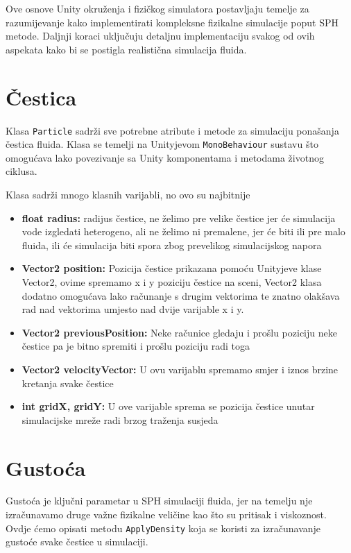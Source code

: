\documentclass[diplomskirad]{fer}
\begin{document}
    Ove osnove Unity okruženja i fizičkog simulatora postavljaju temelje za razumijevanje kako implementirati kompleksne fizikalne simulacije poput SPH metode. Daljnji koraci uključuju detaljnu implementaciju svakog od ovih aspekata kako bi se postigla realistična simulacija fluida.


    \section{Čestica}\label{sec:cestica}

    Klasa \texttt{Particle} sadrži sve potrebne atribute i metode za simulaciju ponašanja čestica fluida.
    Klasa se temelji na Unityjevom \texttt{MonoBehaviour} sustavu što omogućava lako povezivanje sa Unity komponentama i metodama životnog ciklusa.

    Klasa sadrži mnogo klasnih varijabli, no ovo su najbitnije

    \begin{itemize}
        \item \textbf{float radius:} radijus čestice, ne želimo pre velike čestice jer će simulacija vode izgledati heterogeno, ali ne želimo ni premalene, jer će biti ili pre malo fluida,
        ili će simulacija biti spora zbog prevelikog simulacijskog napora
        \item \textbf{Vector2 position:} Pozicija čestice prikazana pomoću Unityjeve klase Vector2, ovime spremamo x i y poziciju čestice na sceni, Vector2 klasa dodatno omogućava lako računanje
        s drugim vektorima te znatno olakšava rad nad vektorima umjesto nad dvije varijable x i y.
        \item \textbf{Vector2 previousPosition:} Neke računice gledaju i prošlu poziciju neke čestice pa je bitno spremiti i prošlu poziciju radi toga
        \item \textbf{Vector2 velocityVector:} U ovu varijablu spremamo smjer i iznos brzine kretanja svake čestice
        \item \textbf{int gridX, gridY:} U ove varijable sprema se pozicija čestice unutar simulacijske mreže radi brzog traženja susjeda
    \end{itemize}


    \section{Gustoća}\label{sec:gustoca}

    Gustoća je ključni parametar u SPH simulaciji fluida, jer na temelju nje izračunavamo druge važne fizikalne veličine kao što su pritisak i viskoznost.
    Ovdje ćemo opisati metodu \texttt{ApplyDensity} koja se koristi za izračunavanje gustoće svake čestice u simulaciji.
\end{document}
